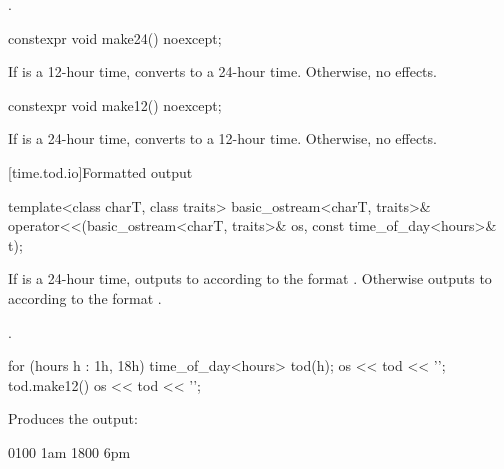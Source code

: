 \begin{itemdescr}
\pnum
\returns {}.
\end{itemdescr}

%
\begin{itemdecl}
constexpr void make24() noexcept;
\end{itemdecl}

\begin{itemdescr}
\pnum
\effects
If  is a 12-hour time,
converts to a 24-hour time.
Otherwise, no effects.
\end{itemdescr}

%
\begin{itemdecl}
constexpr void make12() noexcept;
\end{itemdecl}

\begin{itemdescr}
\pnum
\effects
If  is a 24-hour time,
converts to a 12-hour time.
Otherwise, no effects.
\end{itemdescr}

[time.tod.io]{Formatted output}

%
\begin{itemdecl}
template<class charT, class traits>
  basic_ostream<charT, traits>&
    operator<<(basic_ostream<charT, traits>& os, const time_of_day<hours>& t);
\end{itemdecl}

\begin{itemdescr}
\pnum
\effects
If  is a 24-hour time,
outputs to  according to the format
.
Otherwise
outputs to  according to the format
.

\pnum
\returns {}.

\pnum
\begin{example}
\begin{codeblock}
for (hours h : {1h, 18h}) {
  time_of_day<hours> tod(h);
  os << tod << '\n';
  tod.make12()
  os << tod << '\n';
}
\end{codeblock}

Produces the output:

\begin{codeblock}
0100
1am
1800
6pm
\end{codeblock}
\end{example}
\end{itemdescr}

